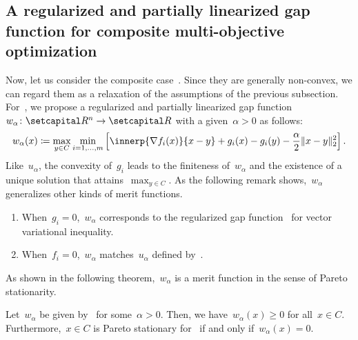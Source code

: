\documentclass[../../main]{subfiles}
\begin{document}
\subsection{A regularized and partially linearized gap function for composite multi-objective optimization} 
Now, let us consider the composite case~.
Since they are generally non-convex, we can regard them as a relaxation of the assumptions of the previous subsection.
For~, we propose a regularized and partially linearized gap function~$w_\alpha \colon \setR^n \to \setR$ with a given~$\alpha > 0$ as follows:
\begin{equation} \label{eq:reg_lin_gap_MO}
    w_\alpha(x) \coloneqq \max_{y \in C} \min_{i = 1, \dots, m} \left[ \innerp{\nabla f_i(x)}{x - y} + g_i(x) - g_i(y) - \frac{\alpha}{2} \norm{x - y}_2^2 \right] 
.\end{equation} 
Like~$u_\alpha$, the convexity of~$g_i$ leads to the finiteness of~$w_\alpha$ and the existence of a unique solution that attains~$\max_{y \in C}$.
As the following remark shows,~$w_\alpha$ generalizes other kinds of merit functions.
\begin{remark} 
    \begin{enumerate}
        \item When~$g_i = 0$,~$w_\alpha$ corresponds to the regularized gap function~ for vector variational inequality. 
        \item When~$f_i = 0$,~$w_\alpha$ matches~$u_\alpha$ defined by~. 
    \end{enumerate}
\end{remark}
As shown in the following theorem,~$w_\alpha$ is a merit function in the sense of Pareto stationarity.
\begin{theorem} 
    Let~$w_\alpha$ be given by~ for some~$\alpha > 0$.
    Then, we have~$w_\alpha(x) \ge 0$ for all~$x \in C$.
    Furthermore,~$x \in C$ is Pareto stationary for~ if and only if~$w_\alpha(x) = 0$.
\end{theorem}
\end{document}
